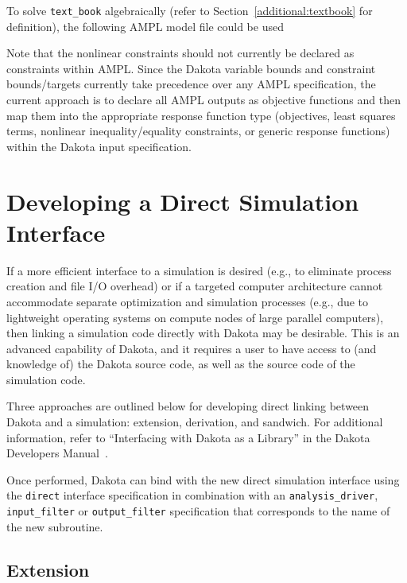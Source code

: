 To solve \texttt{text\_book} algebraically (refer to
Section~\ref{additional:textbook} for definition), the
following AMPL model file could be used
\begin{center}
\begin{bigbox}
\begin{small}
\end{small}
\end{bigbox}
\end{center}
Note that the nonlinear constraints should not currently be declared
as constraints within AMPL.  Since the Dakota variable bounds and
constraint bounds/targets currently take precedence over any AMPL
specification, the current approach is to declare all AMPL outputs as
objective functions and then map them into the appropriate response
function type (objectives, least squares terms, nonlinear
inequality/equality constraints, or generic response functions) within
the Dakota input specification.


\section{Developing a Direct Simulation Interface}\label{advint:direct}

If a more efficient interface to a simulation is desired (e.g., to
eliminate process creation and file I/O overhead) or if a targeted
computer architecture cannot accommodate separate optimization and
simulation processes (e.g., due to lightweight operating systems on
compute nodes of large parallel computers), then linking a simulation
code directly with Dakota may be desirable. This is an advanced
capability of Dakota, and it requires a user to have access to (and
knowledge of) the Dakota source code, as well as the source code of
the simulation code.

Three approaches are outlined below for developing direct linking
between Dakota and a simulation: extension, derivation, and
sandwich. For additional information, refer to ``Interfacing with
Dakota as a Library'' in the Dakota Developers Manual~\cite{DevMan}.

Once performed, Dakota can bind with the new direct simulation
interface using the \texttt{direct} interface specification in
combination with an \texttt{analysis\_driver}, \texttt{input\_filter}
or \texttt{output\_filter} specification that corresponds to the name
of the new subroutine.

\subsection{Extension}\label{advint:direct:extension}

